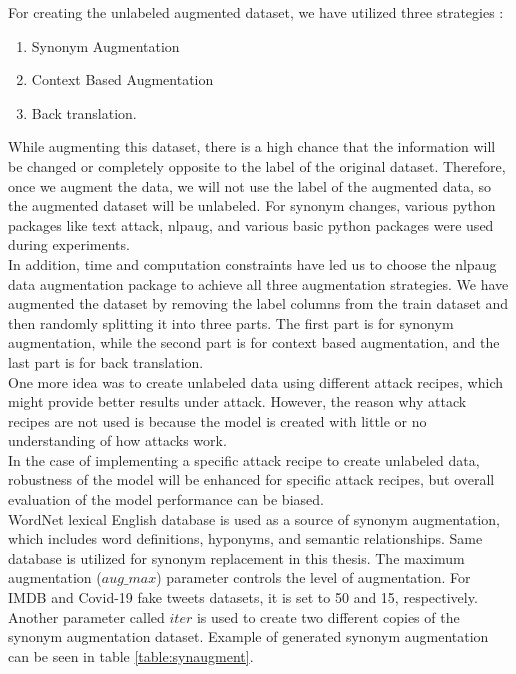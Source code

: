 \documentclass[%
	BCOR=8mm, %
	DIV=12,
	toc=bibliography, %
	toc=listof, %
	oneside, %
	egregdoesnotlikesansseriftitles, %
	]{scrbook}
\begin{document}
For creating the unlabeled augmented dataset, we have utilized three strategies :
\begin{enumerate}
\item  Synonym Augmentation
\item Context Based Augmentation
\item Back translation.
\end{enumerate}
While augmenting this dataset, there is a high chance that the information will be changed or completely opposite to the label of the original dataset. Therefore, once we augment the data, we will not use the label of the augmented data, so the augmented dataset will be unlabeled. For synonym changes, various python packages like text attack, nlpaug, and various basic python packages were used during experiments.\\
In addition, time and computation constraints have led us to choose the nlpaug data augmentation package \cite{ma_nlpaug_2022} to achieve all three augmentation strategies. We have augmented the dataset by removing the label columns from the train dataset and then randomly splitting it into three parts. The first part is for synonym augmentation, while the second part is for context based augmentation, and the last part is for back translation.\\
One more idea was to create unlabeled data using different attack recipes, which might provide better results under attack. However, the reason why attack recipes are not used is because the model is created with little or no understanding of how attacks work. \\
In the case of implementing a specific attack recipe to create unlabeled data,  robustness of the model will be enhanced for specific attack recipes, but overall evaluation of the model performance can be biased.\\
WordNet lexical English database \cite{miller_wordnet_1995} is used as a source of synonym augmentation, which includes word definitions, hyponyms, and semantic relationships. Same database is utilized for synonym replacement in this thesis. The maximum augmentation ($aug\_max$) parameter controls the level of augmentation. For IMDB and Covid-19  fake tweets datasets, it is set to 50 and 15, respectively. Another parameter called $iter$ is used to create two different copies of the synonym augmentation dataset. Example of generated synonym augmentation can be seen in table \ref{table:synaugment}.\\
\end{document}
